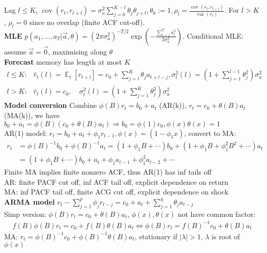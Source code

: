 \documentclass[10pt,landscape, a4paper]{article}
\theoremstyle{remark}
\newcommand{\var}{\operatorname{var}}
\newcommand{\E}{\operatorname{\mathbb{E}}}
\newcommand{\abs}[1]{\left\lvert #1 \right\rvert}
\newcommand{\cov}[1]{\operatorname{cov}(#1)}
\begin{document}
\begin{multicols*}{3}
Lag $l \leq K$, $\cov{r_t, r_{t+l}} = \sigma^2_a \sum^{K-l}_{j=0} \theta_j \theta_{j+l}, \theta_0 := 1, \rho_l = \frac{\cov{r_t, r_{t+l}}}{\var(r_t)}$. For $l>K$, $\rho_l = 0$ since no overlap (finite ACF cut-off).\\
\textbf{MLE} $p(a_1, \dots, a_T \lvert \Vec{a}, \theta) = (2\pi \sigma^2_a)^{-T/2} \exp{(-\frac{\sum^T_{t=1} a^2_t}{2\sigma^2_a})}$. Conditional MLE: assume $\Vec{a} = \Vec{0}$, maximising along $\theta$\\
\textbf{Forecast} memory has length at most $K$
\vspace{-3pt}
\begin{align*}
l\leq K: &\hat{r}_t (l) = \E_t [r_{t+l}] = c_0 + \sum^K_{j=l} \theta_j a_{t+l-j}, \sigma^2_t (l) = (1+ \sum^{l-1}_{j=1} \theta^2_j )\sigma^2_a\\[-5pt]
l>K: &\hat{r}_t (l)=c_0,\quad \sigma^2_t (l) = (1+\sum^K_{j=1} \theta^2_j )\sigma^2_a
\end{align*}
\textbf{Model conversion} Combine $\phi(B)r_t = b_0 +a_t$ (AR(k)),  $r_t = c_0 +\theta(B) a_t$ (MA(k)), we have $b_0 +a_t = \phi(B) (c_0 +\theta(B) a_t) \Rightarrow b_0 = \phi(1)c_0, \phi(x)\theta(x) = 1$\\
AR(1) model: $r_t = b_0 + a_t + \phi_1 r_{t-1}, \phi(x) = (1 - \phi_1x)$, convert to MA:
\begin{align*}
    r_t &= \phi(B)^{-1} b_0 + \phi(B)^{-1} a_t = (1+\phi_1 B+\cdots)b_0 + (1+\phi_1 B +\phi_1^2 B^2+\cdots)a_t\\
    &=(1+\phi_1 B+\cdots)b_0 + a_t + \phi_1 a_{t-1} + \phi^2_1 a_{t-2} + \cdots
\end{align*}
Finite MA implies finite nonzero ACF, thus AR(1) has inf tails off\\
AR: finite PACF cut off, inf ACF tail off, explicit dependence on return\\
MA: inf PACF tail off, finite ACG cut off, explicit dependence on  shock
\\\textbf{ARMA model} $r_t - \sum^p_{j=1} \phi_j r_{t-j} = c_0 + a_t + \sum^q_{j=1} \theta_j a_{t-j}$\\
Simp version: $\phi(B) r_t = c_0 + \theta(B) a_t$, $\phi(x), \theta(x)$ not have common factor:
\begin{align*}
    f(B) \phi(B)r_t = c_0 +f(B)\theta(B)a_t \Leftrightarrow \phi(B) r_t = f(B)^{-1} c_0 + \theta(B)a_t
\end{align*}
MA: $r_t = \phi(B)^{-1} c_0 + \phi(B)^{-1} \theta(B) a_t$, stationary if $\abs{\lambda}>1$, $\lambda$ is root of $\phi(x)$\\

\end{multicols*}
\end{document}
